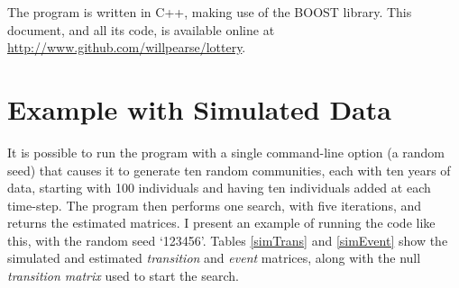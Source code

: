 \documentclass[12pt]{amsart}
\begin{document}
The program is written in C++, making use of the BOOST library. This document, and all its code, is available online at \href{http://www.github.com/willpearse/lottery}{\url{http://www.github.com/willpearse/lottery}}.
\section{Example with Simulated Data}
It is possible to run the program with a single command-line option (a random seed) that causes it to generate ten random communities, each with ten years of data, starting with 100 individuals and having ten individuals added at each time-step. The program then performs one search, with five iterations, and returns the estimated matrices. I present an example of running the code like this, with the random seed `123456'. Tables \ref{simTrans} and \ref{simEvent} show the simulated and estimated \emph{transition} and \emph{event} matrices, along with the null \emph{transition matrix} used to start the search.
\end{document}
